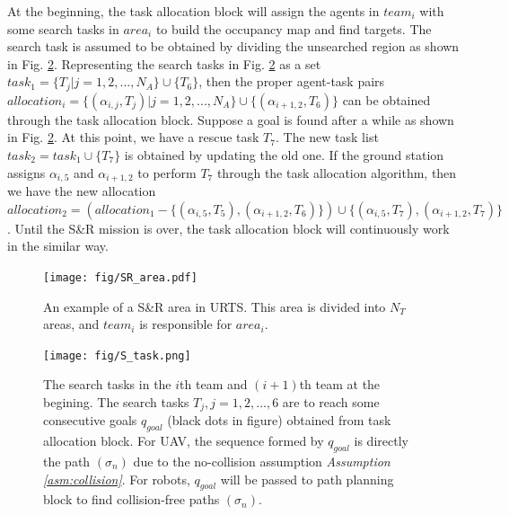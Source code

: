 \documentclass{ieeeaccess}
\begin{document}
At the beginning, the task allocation block will assign the agents in $team_i$ with some search tasks in $area_i$ to build the occupancy map and find targets. The search task is assumed to be obtained by dividing the unsearched region as shown in Fig. \ref{fig:S_task}. Representing the search tasks in Fig. \ref{fig:S_task} as a set $task_1=\{ T_j | j=1,2,...,N_A \}\cup\{T_6\}$, then the proper agent-task pairs $allocation_i=\{ (\alpha_{i,j},T_j) | j=1,2,...,N_A \}\cup\{(\alpha_{i+1,2},T_6)\}$ can be obtained through the task allocation block. Suppose a goal is found after a while as shown in Fig. \ref{fig:S_task}. At this point, we have a rescue task $T_7$. The new task list $task_2=task_1\cup\{ T_7 \}$ is obtained by updating the old one. If the ground station assigns $\alpha_{i,5}$ and $\alpha_{i+1,2}$ to perform $T_7$ through the task allocation algorithm, then we have the new allocation $allocation_2=(allocation_1-\{ (\alpha_{i,5},T_5),(\alpha_{i+1,2},T_6) \})\cup\{ (\alpha_{i,5},T_7),(\alpha_{i+1,2},T_7) \}$. Until the S\&R mission is over, the task allocation block will continuously work in the similar way.
\begin{figure}[htbp]
    \centering
    \texttt{[image: fig/SR\_area.pdf]}\caption{An example of a S\&R area in URTS. This area is divided into $N_T$ areas, and $team_i$ is responsible for $area_i$.}%
    \label{fig:SR_area}
\end{figure}
\begin{figure}[htbp]
    \centering
    \texttt{[image: fig/S\_task.png]}\caption{The search tasks in the $i$th team and $(i+1)$th team at the begining. The search tasks $T_j,j=1,2,...,6$ are to reach some consecutive goals $q_{goal}$ (black dots in figure) obtained from task allocation block. For UAV, the sequence formed by $q_{goal}$ is directly the path $(\sigma_n)$ due to the no-collision assumption \textit{Assumption \ref{asm:collision}}. For robots, $q_{goal}$ will be passed to path planning block to find collision-free paths $(\sigma_n)$.}
    \label{fig:S_task}
\end{figure}
\end{document}
